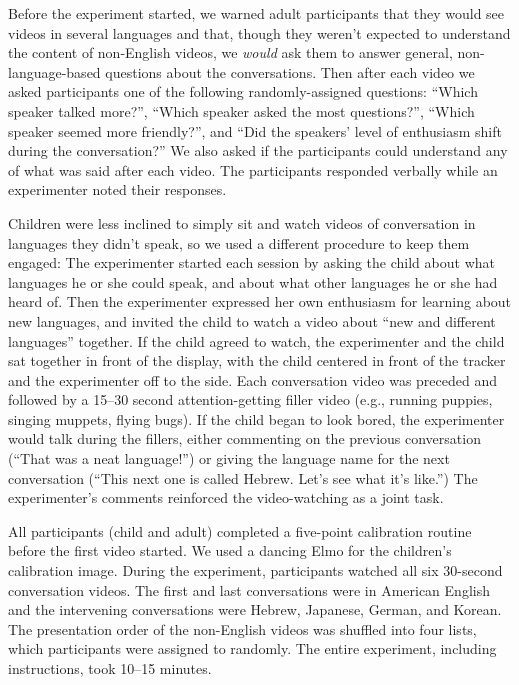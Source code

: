 \documentclass[authoryear, 12pt]{elsarticle}
\begin{document}
Before the experiment started, we warned adult participants that they would see videos in several languages and that, though they weren't expected to understand the content of non-English videos, we \textit{would} ask them to answer general, non-language-based questions about the conversations. Then after each video we asked participants one of the following randomly-assigned questions: ``Which speaker talked more?'', ``Which speaker asked the most questions?'', ``Which speaker seemed more friendly?'', and ``Did the speakers' level of enthusiasm shift during the conversation?'' We also asked if the participants could understand any of what was said after each video. The participants responded verbally while an experimenter noted their responses.

Children were less inclined to simply sit and watch videos of conversation in languages they didn't speak, so we used a different procedure to keep them engaged: The experimenter started each session by asking the child about what languages he or she could speak, and about what other languages he or she had heard of. Then the experimenter expressed her own enthusiasm for learning about new languages, and invited the child to watch a video about ``new and different languages'' together. If the child agreed to watch, the experimenter and the child sat together in front of the display, with the child centered in front of the tracker and the experimenter off to the side. Each conversation video was preceded and followed by a 15--30 second attention-getting filler video (e.g., running puppies, singing muppets, flying bugs). If the child began to look bored, the experimenter would talk during the fillers, either commenting on the previous conversation (``That was a neat language!'') or giving the language name for the next conversation (``This next one is called Hebrew. Let's see what it's like.'') The experimenter's comments reinforced the video-watching as a joint task.

All participants (child and adult) completed a five-point calibration routine before the first video started. We used a dancing Elmo for the children's calibration image. During the experiment, participants watched all six 30-second conversation videos. The first and last conversations were in American English and the intervening conversations were Hebrew, Japanese, German, and Korean. The presentation order of the non-English videos was shuffled into four lists, which participants were assigned to randomly. The entire experiment, including instructions, took 10--15 minutes.
\end{document}
